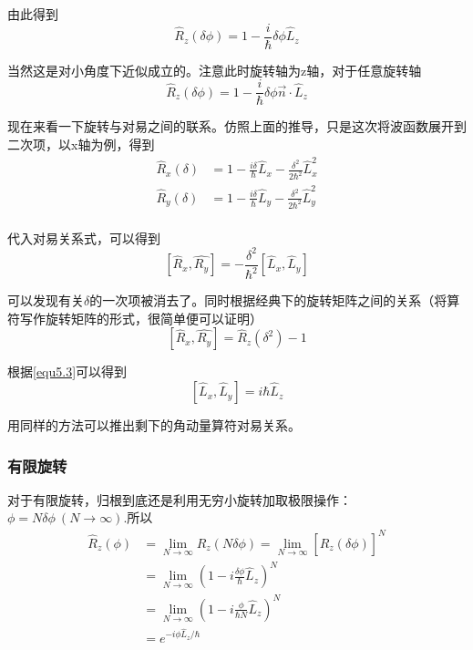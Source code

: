 \documentclass[UTF8]{ctexart}
\begin{document}
\noindent 由此得到 
\begin{equation}
    \hat{R}_z(\delta \phi) = 1 - \frac{i}{\hbar} \delta \phi \hat{L}_z\label{equ5.3}
\end{equation}

    当然这是对小角度下近似成立的。注意此时旋转轴为z轴，对于任意旋转轴
    \begin{equation}
        \hat{R}_z (\delta \phi) = 1 - \frac{i}{\hbar} \delta \phi \vec{n} \cdot \hat{L}_z
    \end{equation}

    现在来看一下旋转与对易之间的联系。仿照上面的推导，只是这次将波函数展开到二次项，以x轴为例，得到
    \begin{equation}
        \begin{aligned}
            \hat{R}_x(\delta) &= 1 - \frac{i \delta }{\hbar} \hat{L}_x - \frac{\delta^2}{2 \hbar^2}\hat{L}_x^2 \\
            \hat{R}_y(\delta) &= 1 - \frac{i \delta}{\hbar}\hat{L}_y - \frac{\delta^2}{2 \hbar^2} \hat{L}_y^2 \\
        \end{aligned}
    \end{equation}

\noindent 代入对易关系式，可以得到
\begin{equation}
    \left[\hat{R}_x,\hat{R_y}\right] = - \frac{\delta^2}{\hbar^2} \left[\hat{L}_x,\hat{L}_y\right]
\end{equation}

\noindent 可以发现有关$\delta$的一次项被消去了。同时根据经典下的旋转矩阵之间的关系（将算符写作旋转矩阵的形式，很简单便可以证明）
\begin{equation}
    \left[\hat{R}_x,\hat{R_y}\right] = \hat{R}_z(\delta^2) -1
\end{equation}

\noindent 根据\autoref{equ5.3}可以得到 
\begin{equation}
    \left[\hat{L}_x,\hat{L}_y\right] = i\hbar \hat{L}_z
\end{equation}

\noindent 用同样的方法可以推出剩下的角动量算符对易关系。

    \subsubsection{有限旋转}
    对于有限旋转，归根到底还是利用无穷小旋转加取极限操作：$\phi = N \delta \phi\ (N \to \infty)$.所以
    \begin{equation}
        \begin{aligned}
            \hat{R}_z(\phi) &= \lim_{N \to \infty} \hat{R}_z(N\delta \phi) = \lim_{N\to \infty}\left[\hat{R}_z(\delta \phi)\right]^N  \\
            &= \lim_{N \to \infty}\left(1 - i \frac{\delta \phi}{\hbar} \hat{L}_z\right)^N \\
            &=\lim_{N \to \infty}\left(1 - i \frac{ \phi}{\hbar N} \hat{L}_z\right)^N \\ 
            & = e^{- i \phi \hat{L}_z/\hbar}
        \end{aligned}
    \end{equation}
\end{document}
